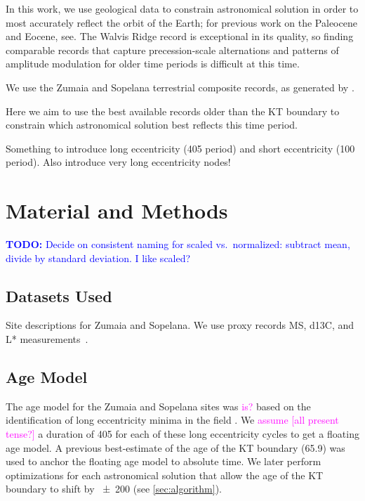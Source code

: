 \documentclass[draft]{agujournal2019}
\newcommand{\rez}{\textcolor{magenta}}
\newcommand{\ijk}{\textcolor{blue}}
\begin{document}
In this work, we use geological data to constrain astronomical solution in order to most accurately reflect the orbit of the Earth; for previous work on the Paleocene and Eocene, see.
The Walvis Ridge record is exceptional in its quality, so finding comparable records that capture precession-scale alternations and patterns of amplitude modulation for older time periods is difficult at this time.

We use the Zumaia and Sopelana terrestrial composite records, as generated by .

Here we aim to use the best available records older than the \gls{KT} boundary to constrain which astronomical solution best reflects this time period.

Something to introduce long eccentricity (\qty{405}{\kiloyear} period) and short eccentricity (\qty{100}{\kiloyear} period).
Also introduce very long eccentricity nodes!



\section{Material and Methods}\label{sec:mm}

\ijk{\textbf{TODO:} Decide on consistent naming for scaled vs.\ normalized: subtract mean, divide by standard deviation. I like scaled?}

\subsection{Datasets Used}\label{sec:data}

Site descriptions for Zumaia and Sopelana.
We use proxy records \gls{MS}, \gls{d13C}, and \gls{L*} measurements~\cite{Batenburg2012,Batenburg2014}.

\subsection{Age Model}\label{sec:agemodel}

The age model for the Zumaia and Sopelana sites was \rez{is?} based on the identification of long eccentricity minima in the field .
We \rez{assume [all present tense?]} a duration of \qty{405}{\kiloyear} for each of these long eccentricity cycles to get a floating age model.
A previous best-estimate of the age of the \gls{KT} boundary (\qty{65.9}{\millionyearago}) was used to anchor the floating age model to absolute time.
We later perform optimizations for each astronomical solution that allow the age of the \gls{KT} boundary to shift by \qty{\pm200}{\kiloyear} (see \cref{sec:algorithm}).
\end{document}
